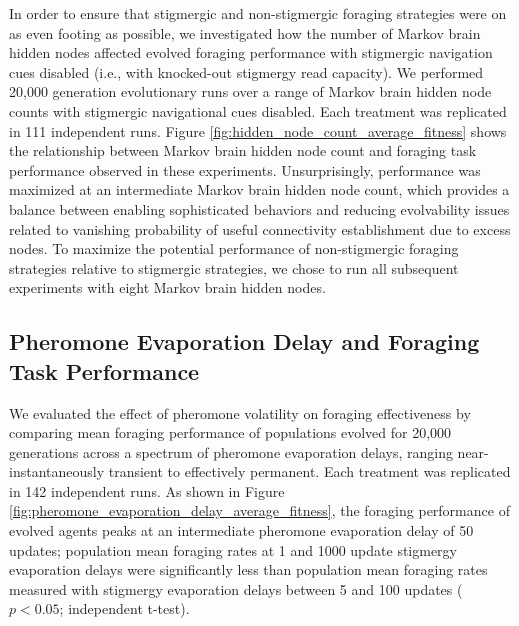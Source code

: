 In order to ensure that stigmergic and non-stigmergic foraging strategies were on as even footing as possible, we investigated how the number of Markov brain hidden nodes affected evolved foraging performance with stigmergic navigation cues disabled (i.e., with knocked-out stigmergy read capacity).
We performed 20,000 generation evolutionary runs over a range of Markov brain hidden node counts with stigmergic navigational cues disabled.
Each treatment was replicated in 111 independent runs.
Figure \ref{fig:hidden_node_count_average_fitness} shows the relationship between Markov brain hidden node count and foraging task performance observed in these experiments.
Unsurprisingly, performance was maximized at an intermediate Markov brain hidden node count, which provides a balance between enabling sophisticated behaviors and reducing evolvability issues related to vanishing probability of useful connectivity establishment due to excess nodes.
To maximize the potential performance of non-stigmergic foraging strategies relative to stigmergic strategies, we chose to run all subsequent experiments with eight Markov brain hidden nodes.

\subsection{Pheromone Evaporation Delay and Foraging Task Performance}




We evaluated the effect of pheromone volatility on foraging effectiveness by comparing mean foraging performance of populations evolved for 20,000 generations across a spectrum of pheromone evaporation delays, ranging near-instantaneously transient to effectively permanent.
Each treatment was replicated in 142 independent runs.
As shown in Figure \ref{fig:pheromone_evaporation_delay_average_fitness}, the foraging performance of evolved agents peaks at an intermediate pheromone evaporation delay of 50 updates;
population mean foraging rates at 1 and 1000 update stigmergy evaporation delays were significantly less than population mean foraging rates measured with stigmergy evaporation delays between 5 and 100 updates ($p < 0.05$; independent t-test).


